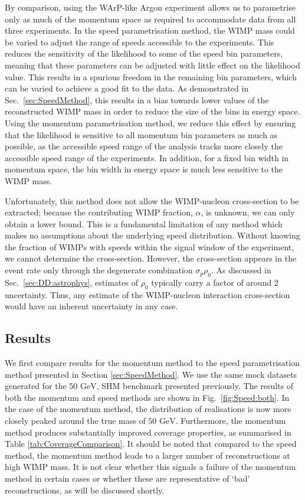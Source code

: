 By comparison, using the WArP-like Argon experiment allows us to parametrise only as much of the momentum space as required to accommodate data from all three experiments. In the speed parametrisation method, the WIMP mass could be varied to adjust the range of speeds accessible to the experiments. This reduces the sensitivity of the likelihood to some of the speed bin parameters, meaning that these parameters can be adjusted with little effect on the likelihood value. This results in a spurious freedom in the remaining bin parameters, which can be varied to achieve a good fit to the data. As demonstrated in Sec.\ \ref{sec:SpeedMethod}, this results in a bias towards lower values of the reconstructed WIMP mass in order to reduce the size of the bins in energy space. Using the momentum parametrisation method, we reduce this effect by ensuring that the likelihood is sensitive to all momentum bin parameters as much as possible, as the accessible speed range of the analysis tracks more closely the accessible speed range of the experiments. In addition, for a fixed bin width in momentum space, the bin width in energy space is much less sensitive to the WIMP mass.

Unfortunately, this method does not allow the WIMP-nucleon cross-section to be extracted; because the contributing WIMP fraction, \(\alpha\), is unknown, we can only obtain a lower bound. This is a fundamental limitation of any method which makes no assumptions about the underlying speed distribution. Without knowing the fraction of WIMPs with speeds within the signal window of the experiment, we cannot determine the cross-section. However, the cross-section appears in the event rate only through the degenerate combination \(\sigma_p \rho_0\). As discussed in Sec.~\ref{sec:DD:astrophys}, estimates of $\rho_0$ typically carry a factor of around 2 uncertainty. Thus, any estimate of the WIMP-nucleon interaction cross-section would have an inherent uncertainty in any case.

\subsection{Results}

We first compare results for the momentum method to the speed parametrisation method presented in Section \ref{sec:SpeedMethod}. We use the same mock datasets generated for the \(50 \textrm{ GeV}\), SHM benchmark presented previously. The results of both the momentum and speed methods are shown in Fig.\ \ref{fig:Speed:both}. In the case of the momentum method, the distribution of realisations is now more closely peaked around the true mass of \(50 \textrm{ GeV}\). Furthermore, the momentum method produces substantially improved coverage properties, as summarised in Table \ref{tab:CoverageComparison}. It should be noted that compared to the speed method, the momentum method leads to a larger number of reconstructions at high WIMP mass. It is not clear whether this signals a failure of the momentum method in certain cases or whether these are representative of `bad' reconstructions, as will be discussed shortly.

